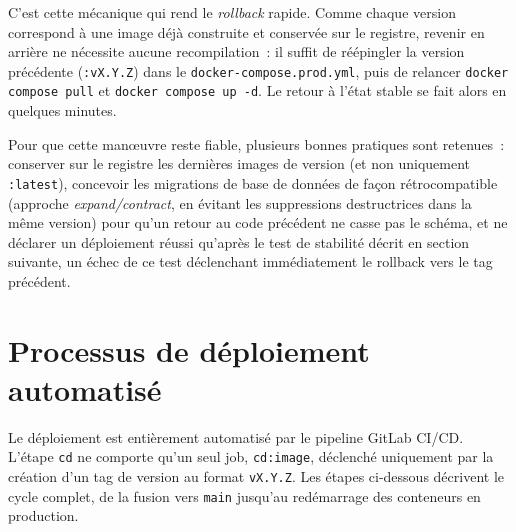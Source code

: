 C'est cette mécanique qui rend le \emph{rollback} rapide. Comme chaque version correspond à une image déjà construite et conservée sur le registre, revenir en arrière ne nécessite aucune recompilation~: il suffit de réépingler la version précédente (\texttt{:vX.Y.Z}) dans le \texttt{docker-compose.prod.yml}, puis de relancer \texttt{docker compose pull} et \texttt{docker compose up -d}. Le retour à l'état stable se fait alors en quelques minutes.

Pour que cette manœuvre reste fiable, plusieurs bonnes pratiques sont retenues~: conserver sur le registre les dernières images de version (et non uniquement \texttt{:latest}), concevoir les migrations de base de données de façon rétrocompatible (approche \emph{expand/contract}, en évitant les suppressions destructrices dans la même version) pour qu'un retour au code précédent ne casse pas le schéma, et ne déclarer un déploiement réussi qu'après le test de stabilité décrit en section suivante, un échec de ce test déclenchant immédiatement le rollback vers le tag précédent.

\section{Processus de déploiement automatisé}
Le déploiement est entièrement automatisé par le pipeline GitLab CI/CD. L'étape \texttt{cd} ne comporte qu'un seul job, \texttt{cd:image}, déclenché uniquement par la création d'un tag de version au format \texttt{vX.Y.Z}. Les étapes ci-dessous décrivent le cycle complet, de la fusion vers \texttt{main} jusqu'au redémarrage des conteneurs en production.

